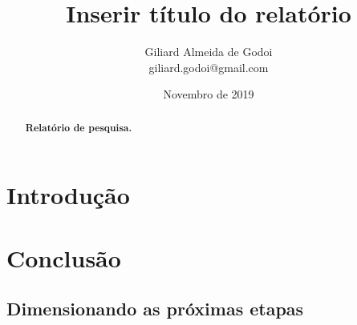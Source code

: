 \title{Inserir título do relatório}

\author{Giliard Almeida de Godoi \\ \small{giliard.godoi@gmail.com}}
\date{Novembro de 2019}

\maketitle

\begin{abstract}
    \textbf{Relatório de pesquisa.}
\end{abstract}


\section{Introdução}
\label{sec:introducao}

\section{Conclusão}
\label{sec:conclusao}

\subsection{Dimensionando as próximas etapas}
\label{sec:dimensionando}